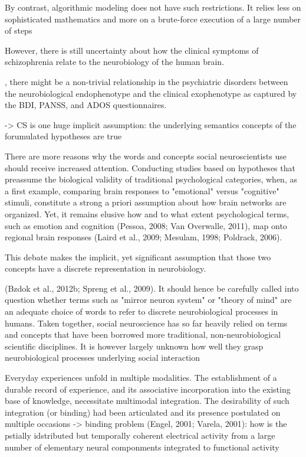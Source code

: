 \documentclass[authoryear,review,3p]{elsarticle}
\begin{document}
By contrast, algorithmic modeling does not have such restrictions. It relies less on sophisticated mathematics and more on a brute-force execution of a large number of steps

However, there is still uncertainty about how the clinical symptoms of schizophrenia relate to the neurobiology of the human brain. 

, there might be a non-trivial relationship in the psychiatric disorders between the neurobiological endophenotype and the clinical exophenotype as captured by the BDI, PANSS, and ADOS questionnaires.

-> CS is one huge implicit assumption:
the underlying semantics concepts of the forumulated hypotheses are true

There are more reasons why the words and concepts social neuroscientists use should receive increased attention. Conducting studies based on hypotheses that preassume the biological validity of traditional psychological categories, when, as a first example, comparing brain responses to "emotional" versus "cognitive" stimuli, constitute a strong a priori assumption about how brain networks are organized. Yet, it remains elusive how and to what extent psychological terms, such as emotion and cognition (Pessoa, 2008; Van Overwalle, 2011), map onto regional brain responses (Laird et al., 2009; Mesulam, 1998; Poldrack, 2006). 

This debate makes the implicit, yet significant assumption that those two concepts have a discrete representation in neurobiology. 

(Bzdok et al., 2012b; Spreng et al., 2009). It should hence be carefully called into question whether terms such as "mirror neuron system" or "theory of mind" are an adequate choice of words to refer to discrete neurobiological processes in humans. Taken together, social neuroscience has so far heavily relied on terms and concepts that have been borrowed more traditional, non-neurobiological scientific disciplines. It is however largely unknown how well they grasp neurobiological processes underlying social interaction



Everyday experiences unfold in multiple modalities. The establishment of a durable record of experience, and its associative incorporation into the existing base of knowledge, necessitate multimodal integration. The desirability of such integration (or binding) had been articulated and its presence postulated on multiple occasions
-> binding problem (Engel, 2001; Varela, 2001):
how is the pstially idstributed but temporally coherent electrical activity
from a large number of elementary neural componments integrated to functional activity
\end{document}
